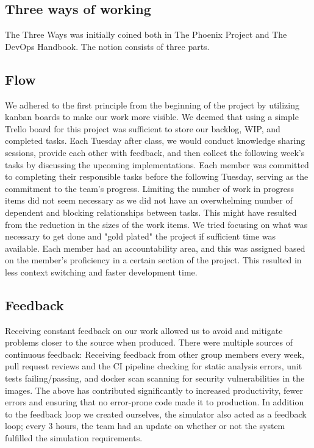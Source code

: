 \subsection*{Three ways of working}

The Three Ways was initially coined both in The Phoenix Project and The DevOps Handbook. The notion consists of three parts.

\subsection*{Flow}
We adhered to the first principle from the beginning of the project by utilizing kanban boards to make our work more visible. We deemed that using a simple Trello board for this project was sufficient to store our backlog, WIP, and completed tasks. Each Tuesday after class, we would conduct knowledge sharing sessions, provide each other with feedback, and then collect the following week's tasks by discussing the upcoming implementations. Each member was committed to completing their responsible tasks before the following Tuesday, serving as the commitment to the team's progress. Limiting the number of work in progress items did not seem necessary as we did not have an overwhelming number of dependent and blocking relationships between tasks. This might have resulted from the reduction in the sizes of the work items. We tried focusing on what was necessary to get done and "gold plated" the project if sufficient time was available. Each member had an accountability area, and this was assigned based on the member's proficiency in a certain section of the project. This resulted in less context switching and faster development time.
\subsection*{Feedback}

Receiving constant feedback on our work allowed us to avoid and mitigate problems closer to the source when produced. There were multiple sources of continuous feedback: Receiving feedback from other group members every week, pull request reviews and the CI pipeline checking for static analysis errors, unit tests failing/passing, and docker scan scanning for security vulnerabilities in the images. The above has contributed significantly to increased productivity, fewer errors and ensuring that no error-prone code made it to production. In addition to the feedback loop we created ourselves, the simulator also acted as a feedback loop; every 3 hours, the team had an update on whether or not the system fulfilled the simulation requirements.



